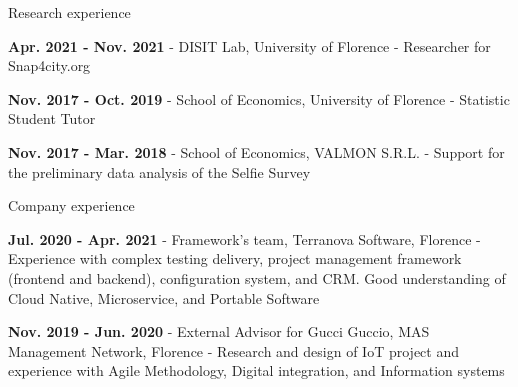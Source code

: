 
\begin{cventries}
  \cventry
    {Research experience}
    {}
    {}
    {}
    {
      \begin{cvitems}
        \item{\textbf{Apr. 2021 - Nov. 2021} - DISIT Lab, University of Florence - Researcher for Snap4city.org}
        \item{\textbf{Nov. 2017 - Oct. 2019} - School of Economics, University of Florence - Statistic Student Tutor}
        \item{\textbf{Nov. 2017 - Mar. 2018} - School of Economics, VALMON S.R.L. - Support for the preliminary data analysis of the Selfie Survey}
      \end{cvitems}
    }
  \cventry
    {Company experience}
    {}
    {}
    {}
    {
      \begin{cvitems}
        \item{\textbf{Jul. 2020 - Apr. 2021} - Framework's team, Terranova Software, Florence - Experience with complex testing delivery, project management framework (frontend and backend), configuration system, and CRM. Good understanding of Cloud Native, Microservice, and Portable Software}
        \item{\textbf{Nov. 2019 - Jun. 2020} - External Advisor for Gucci Guccio, MAS Management Network, Florence - Research and design of IoT project and experience with Agile Methodology, Digital integration, and Information systems}
      \end{cvitems}
    }
\end{cventries}
